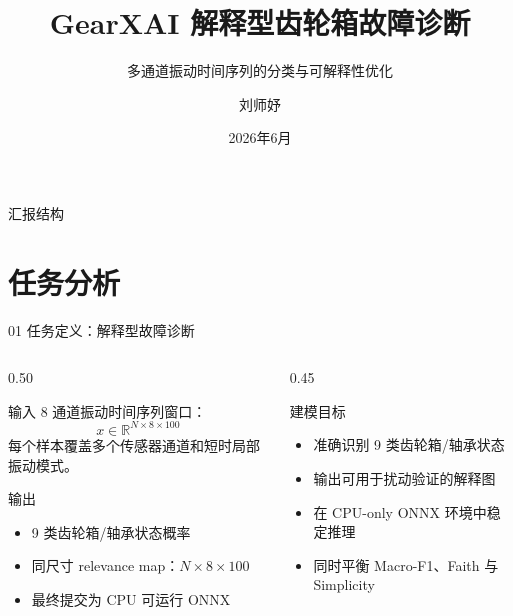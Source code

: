 \documentclass[aspectratio=169]{beamer}
\author[刘师妤]{刘师妤}
\title[GearXAI 解释型齿轮箱故障诊断]{GearXAI 解释型齿轮箱故障诊断}
\subtitle{多通道振动时间序列的分类与可解释性优化}
\institute[中国人民大学信息学院]{中国人民大学信息学院\\学号：2024201568}
\date{2026年6月}
\newcommand{\tightitems}{\setlength{\itemsep}{0.32em}}
\begin{document}
\kaishu

\begin{frame}
    \titlepage
\end{frame}

\begin{frame}{汇报结构}
    \tableofcontents
\end{frame}

\section{任务分析}

\begin{frame}{01 任务定义：解释型故障诊断}
    \small
    \begin{columns}[T,onlytextwidth]
        \begin{column}{0.50\textwidth}
            \begin{block}{输入}
                8 通道振动时间序列窗口：
                \[
                    x \in \mathbb{R}^{N \times 8 \times 100}
                \]
                每个样本覆盖多个传感器通道和短时局部振动模式。
            \end{block}
            \begin{block}{输出}
                \begin{itemize}
                    \tightitems
                    \item 9 类齿轮箱/轴承状态概率
                    \item 同尺寸 relevance map：$N \times 8 \times 100$
                    \item 最终提交为 CPU 可运行 ONNX
                \end{itemize}
            \end{block}
        \end{column}
        \begin{column}{0.45\textwidth}
            \begin{block}{建模目标}
                \begin{itemize}
                    \tightitems
                    \item 准确识别 9 类齿轮箱/轴承状态
                    \item 输出可用于扰动验证的解释图
                    \item 在 CPU-only ONNX 环境中稳定推理
                    \item 同时平衡 Macro-F1、Faith 与 Simplicity
                \end{itemize}
            \end{block}
        \end{column}
    \end{columns}
\end{frame}
\end{document}
